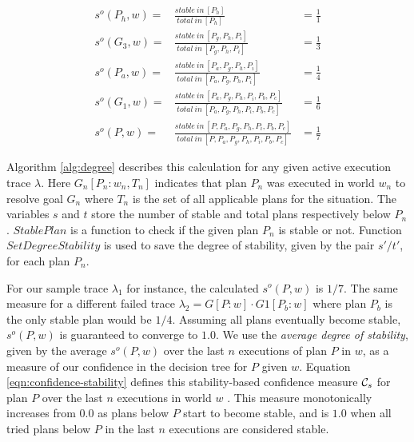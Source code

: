 \begin{eqnarray*}
s^o(P_h,w) = & \frac{stable~in~[P_h]}{total~in~[P_h]} & = \frac{1}{1}  \\
s^o(G_3,w) = & \frac{stable~in~[P_g,P_h,P_i]}{total~in~[P_g,P_h,P_i]} & = \frac{1}{3}  \\
s^o(P_a,w) = & \frac{stable~in~[P_a,P_g,P_h,P_i]}{total~in~[P_a,P_g,P_h,P_i]} & = \frac{1}{4} \\
s^o(G_1,w) = & \frac{stable~in~[P_a,P_g,P_h,P_i,P_b,P_c]}{total~in~[P_a,P_g,P_h,P_i,P_b,P_c]} & = \frac{1}{6}  \\
s^o(P,w) = & \frac{stable~in~[P,P_a,P_g,P_h,P_i,P_b,P_c]}{total~in~[P,P_a,P_g,P_h,P_i,P_b,P_c]} & = \frac{1}{7} 
\end{eqnarray*}

Algorithm \ref{alg:degree} describes this calculation for any given active execution trace $\lambda$. Here $G_n[P_n:w_n,T_n]$ indicates that plan $P_n$ was executed in world $w_n$ to resolve goal $G_n$ where $T_n$ is the set of all applicable plans for the situation. The variables $s$ and $t$ store the number of stable and total plans respectively below $P_n$. $StablePlan$ is a function to check if the given plan $P_n$ is stable or not. Function $SetDegreeStability$ is used to save the degree of stability, given by the pair $s'/t'$, for each plan $P_n$.

\begin{algorithm}[ht]
\caption{$UpdateDegreeStability(\lambda, s, t, k, \epsilon)$}
\label{alg:degree}
\end{algorithm}

For our sample trace $\lambda_1$ for instance, the calculated $s^o(P,w)$ is $1/7$. The same measure for a different failed trace $\lambda_2=G[P:w] \cdot G1[P_b:w]$ where plan $P_b$ is the only stable plan would be $1/4$. Assuming all plans eventually become stable, $s^o(P,w)$ is guaranteed to converge to $1.0$. We use the {\em average degree of stability}, given by the average $s^o(P,w)$ over the last $n$ executions of plan $P$ in $w$, as a measure of our confidence in the decision tree for $P$ given $w$. Equation \ref{eqn:confidence-stability} defines this stability-based confidence measure ${\mathcal{C}}_s$ for plan $P$ over the last $n$ executions in world $w$ . This measure monotonically increases from $0.0$ as plans below $P$ start to become stable, and is $1.0$ when all tried plans below $P$ in the last $n$ executions are considered stable. 

